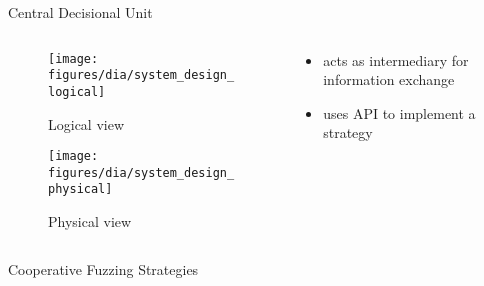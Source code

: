 \documentclass[handout]{beamer}
\begin{document}
\begin{frame}{Central Decisional Unit}
    \begin{columns}
        \begin{column}{.5\textwidth}
            \begin{figure}
                \texttt{[image: figures/dia/system\_design\_logical]}
                \caption{Logical view}
            \end{figure}
            \begin{figure}
                \texttt{[image: figures/dia/system\_design\_physical]}
                \caption{Physical view}
            \end{figure}
        \end{column}
        \begin{column}{.5\textwidth}
            \begin{itemize}
                \item{} acts as intermediary for information exchange
                \item{} uses API to implement a strategy
            \end{itemize}
        \end{column}
    \end{columns}
\end{frame}

\begin{frame}[fragile]{Cooperative Fuzzing Strategies}
\end{frame}
\end{document}
